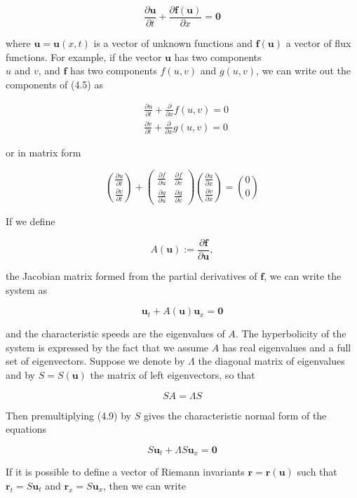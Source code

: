 \documentclass[10pt]{article}
\begin{document}
\[
\frac{\partial \mathbf{u}}{\partial t}+\frac{\partial \mathbf{f}(\mathbf{u})}{\partial x}=\mathbf{0}
\]

where \(\mathbf{u}=\mathbf{u}(x, t)\) is a vector of unknown functions and \(\mathbf{f}(\mathbf{u})\) a vector of flux functions. For example, if the vector \(\mathbf{u}\) has two components\\
\(u\) and \(v\), and \(\mathbf{f}\) has two components \(f(u, v)\) and \(g(u, v)\), we can write out the components of (4.5) as

\[
\begin{aligned}
& \frac{\partial u}{\partial t}+\frac{\partial}{\partial x} f(u, v)=0 \\
& \frac{\partial v}{\partial t}+\frac{\partial}{\partial x} g(u, v)=0
\end{aligned}
\]

or in matrix form

\[
\binom{\frac{\partial u}{\partial t}}{\frac{\partial v}{\partial t}}+\left(\begin{array}{cc}
\frac{\partial f}{\partial u} & \frac{\partial f}{\partial v} \\
\frac{\partial g}{\partial u} & \frac{\partial g}{\partial v}
\end{array}\right)\binom{\frac{\partial u}{\partial x}}{\frac{\partial v}{\partial x}}=\binom{0}{0}
\]

If we define

\[
A(\mathbf{u}):=\frac{\partial \mathbf{f}}{\partial \mathbf{u}},
\]

the Jacobian matrix formed from the partial derivatives of \(\mathbf{f}\), we can write the system as

\[
\mathbf{u}_{t}+A(\mathbf{u}) \mathbf{u}_{x}=\mathbf{0}
\]

and the characteristic speeds are the eigenvalues of \(A\). The hyperbolicity of the system is expressed by the fact that we assume \(A\) has real eigenvalues and a full set of eigenvectors. Suppose we denote by \(\Lambda\) the diagonal matrix of eigenvalues and by \(S=S(\mathbf{u})\) the matrix of left eigenvectors, so that

\[
S A=\Lambda S
\]

Then premultiplying (4.9) by \(S\) gives the characteristic normal form of the equations

\[
S \mathbf{u}_{t}+\Lambda S \mathbf{u}_{x}=\mathbf{0}
\]

If it is possible to define a vector of Riemann invariants \(\mathbf{r}=\mathbf{r}(\mathbf{u})\) such that \(\mathbf{r}_{t}=S \mathbf{u}_{t}\) and \(\mathbf{r}_{x}=S \mathbf{u}_{x}\), then we can write
\end{document}
